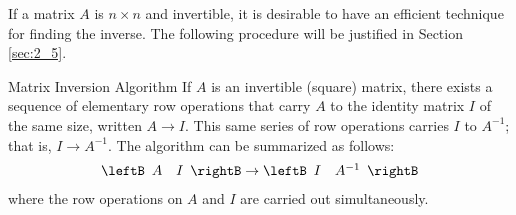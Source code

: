 If a matrix $A$ is $n \times n$ and invertible, it is desirable to have an efficient technique for finding the inverse. The following procedure will be justified in Section \ref{sec:2_5}.

\begin{theorem*}[label=thm:004348]{Matrix Inversion Algorithm}
If $A$ is an invertible (square) matrix, there exists a sequence of elementary row operations that carry $A$ to the identity matrix $I$ of the same size, written $A \to I$. This same series of row operations carries $I$ to $A^{-1}$; that is, $I \to A^{-1}$. The algorithm can be summarized as follows:
\begin{equation*}
\leftB \begin{array}{cc}
A & I
\end{array} \rightB \rightarrow 
\leftB \begin{array}{cc}
I & A^{-1}
\end{array} \rightB
\end{equation*}
where the row operations on $A$ and $I$ are carried out simultaneously.
\end{theorem*}


